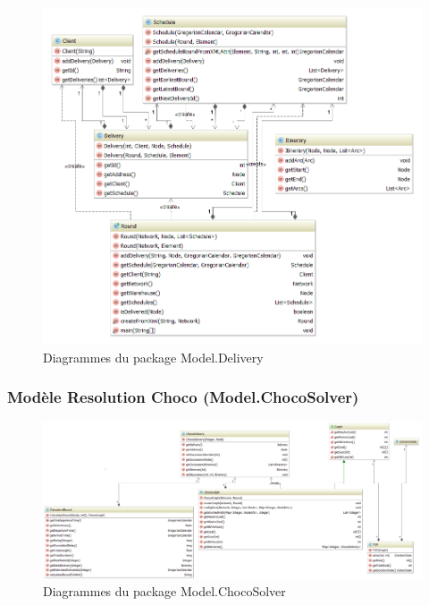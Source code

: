 \begin{figure}[h]
    \centering
    \includegraphics[width=160mm]{../diagrams/classes_packages/classes_packages/model/delivery.png}
    \caption{Diagrammes du package Model.Delivery}
    \label{diagram:uml_model_delivery}
\end{figure}
\pagebreak

\subsubsection{Mod\`ele Resolution Choco (Model.ChocoSolver)}

\begin{figure}[h]
    \centering
    \includegraphics[width=160mm]{../diagrams/classes_packages/classes_packages/model/chocoSolver.png}
    \caption{Diagrammes du package Model.ChocoSolver}
    \label{diagram:uml_model_choco}
\end{figure}
\pagebreak

